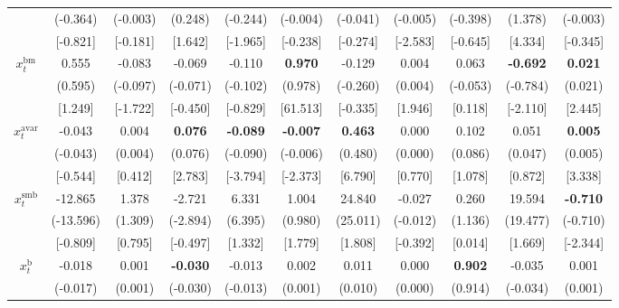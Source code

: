 \documentclass[
  a4paper,
  oneside]{memoir}
\begin{document}
\begin{landscape}
\begin{table}[H]
\begin{threeparttable}
\begin{tabular}[t]{ccccccccccc}
\rowcolor{gray!6}   & (-0.364) & (-0.003) & (0.248) & (-0.244) & (-0.004) & (-0.041) & (-0.005) & (-0.398) & (1.378) & (-0.003)\\
 
 & [-0.821] & [-0.181] & [1.642] & [-1.965] & [-0.238] & [-0.274] & [-2.583] & [-0.645] & [4.334] & [-0.345]\\
 
\rowcolor{gray!6}  $x_t^{\text{bm}}$ & 0.555 & -0.083 & -0.069 & -0.110 & \textbf{ 0.970} & -0.129 & 0.004 & 0.063 & \textbf{-0.692} & \textbf{ 0.021}\\
 
 & (0.595) & (-0.097) & (-0.071) & (-0.102) & (0.978) & (-0.260) & (0.004) & (-0.053) & (-0.784) & (0.021)\\
 
\rowcolor{gray!6}   & [1.249] & [-1.722] & [-0.450] & [-0.829] & [61.513] & [-0.335] & [1.946] & [0.118] & [-2.110] & [2.445]\\
 
$x_t^{\text{avar}}$ & -0.043 & 0.004 & \textbf{ 0.076} & \textbf{-0.089} & \textbf{-0.007} & \textbf{ 0.463} & 0.000 & 0.102 & 0.051 & \textbf{ 0.005}\\
 
\rowcolor{gray!6}   & (-0.043) & (0.004) & (0.076) & (-0.090) & (-0.006) & (0.480) & (0.000) & (0.086) & (0.047) & (0.005)\\
 
 & [-0.544] & [0.412] & [2.783] & [-3.794] & [-2.373] & [6.790] & [0.770] & [1.078] & [0.872] & [3.338]\\
 
\rowcolor{gray!6}  $x_t^{\text{smb}}$ & -12.865 & 1.378 & -2.721 & 6.331 & 1.004 & 24.840 & -0.027 & 0.260 & 19.594 & \textbf{-0.710}\\
 
 & (-13.596) & (1.309) & (-2.894) & (6.395) & (0.980) & (25.011) & (-0.012) & (1.136) & (19.477) & (-0.710)\\
 
\rowcolor{gray!6}   & [-0.809] & [0.795] & [-0.497] & [1.332] & [1.779] & [1.808] & [-0.392] & [0.014] & [1.669] & [-2.344]\\
 
$x_t^{\text{b}}$ & -0.018 & 0.001 & \textbf{-0.030} & -0.013 & 0.002 & 0.011 & 0.000 & \textbf{ 0.902} & -0.035 & 0.001\\
 
\rowcolor{gray!6}   & (-0.017) & (0.001) & (-0.030) & (-0.013) & (0.001) & (0.010) & (0.000) & (0.914) & (-0.034) & (0.001)\\
 

\end{tabular}
\end{threeparttable}
\end{table}
\end{landscape}
\end{document}
